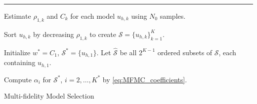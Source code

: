 \normalem
\begin{algorithm}[!ht]
\label{algo:MFMC_Algo_model_selection}
\DontPrintSemicolon    
   \vspace{1ex}
    
    \vspace{1ex}
    \hrule \vspace{1ex}

   Estimate $\rho_{1,k}$ and $C_k$ for each model $u_{h, k}$ using $N_0$ samples.
   
   
   Sort $u_{h, k}$ by decreasing $\rho_{1,k}$ to create $\mathcal{S}=\{u_{h, k}\}_{k=1}^K$. 
   
   Initialize $w^*=C_1$, $\mathcal{S}^*=\{u_{h, 1}\}$. Let $ \mathcal{\widehat S}$ be all $2^{K-1}$ ordered subsets of $\mathcal{S}$, each containing $u_{h, 1}$. 

    Compute $\alpha_i$ for $\mathcal{S}^*$, $i=2,\dots, K^*$ by \eqref{eq:MFMC_coefficients}.
\caption{Multi-fidelity Model Selection}
\end{algorithm}
\ULforem

